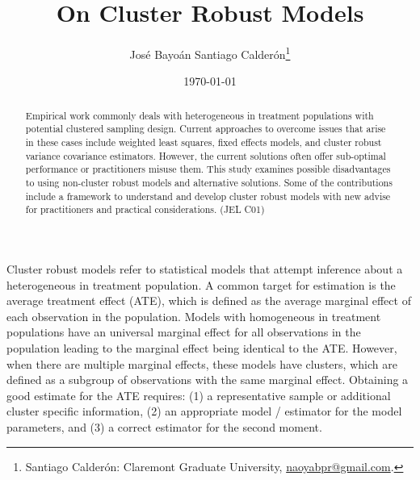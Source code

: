 \documentclass{jbsc}
\begin{document}
\title{On Cluster Robust Models}
\author{José Bayoán Santiago Calderón\thanks{Santiago Calderón: Claremont Graduate University, \href{mailto:naoyabpr@gmail.com}{naoyabpr@gmail.com}.}}
\date{\today}

\maketitle

\begin{abstract}
Empirical work commonly deals with heterogeneous in treatment populations with potential clustered sampling design. Current approaches to overcome issues that arise in these cases include weighted least squares, fixed effects models, and cluster robust variance covariance estimators. However, the current solutions often offer sub-optimal performance or practitioners misuse them. This study examines possible disadvantages to using non-cluster robust models and alternative solutions. Some of the contributions include a framework to understand and develop cluster robust models with new advise for practitioners and practical considerations. (JEL C01)
\end{abstract}

Cluster robust models refer to statistical models that attempt inference about a heterogeneous in treatment population. A common target for estimation is the average treatment effect (ATE), which is defined as the average marginal effect of each observation in the population. Models with homogeneous in treatment populations have an universal marginal effect for all observations in the population leading to the marginal effect being identical to the ATE. However, when there are multiple marginal effects, these models have clusters, which are defined as a subgroup of observations with the same marginal effect. Obtaining a good estimate for the ATE requires: (1) a representative sample or additional cluster specific information, (2) an appropriate model / estimator for the model parameters, and (3) a correct estimator for the second moment.
\end{document}
